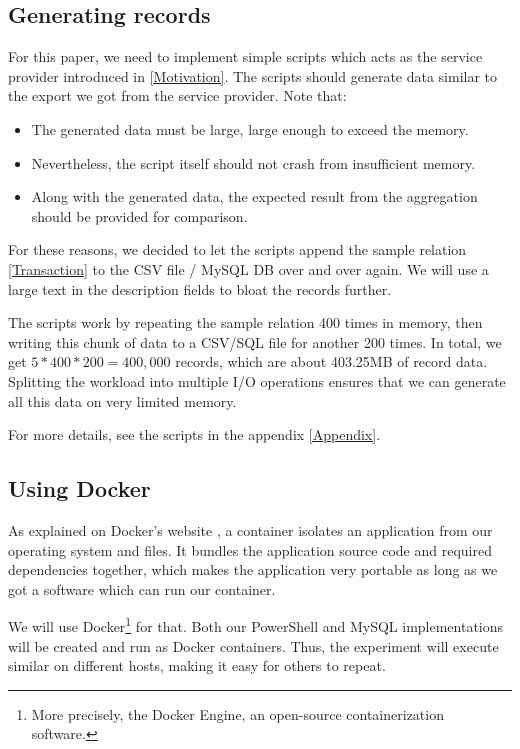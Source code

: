 \subsection{Generating records} \label{Generating records}

For this paper, we need to implement simple scripts which acts as the
service provider introduced in \ref{Motivation}. The scripts
should generate data similar to the export we got from
the service provider. Note that:
\begin{itemize}
    \item The generated data must be large, large enough to exceed
        the memory.
    \item Nevertheless, the script itself should not crash from
        insufficient memory.
    \item Along with the generated data, the expected result from the
        aggregation should be provided for comparison.
\end{itemize}
For these reasons, we decided to let the scripts append the
sample relation \ref{Transaction} to the \gls{CSV} file / \gls{MySQL} \gls{DB}
over and over again. We will use a large text in the description
fields to bloat the records further.

The scripts work by repeating the sample relation 400 times in memory,
then writing this chunk of data to a \gls{CSV}/\gls{SQL} file for another 200 times.
In total, we get $5*400*200=400,000$ records, which are about 403.25MB
of record data. Splitting the workload into multiple \gls{I/O} operations
ensures that we can generate all this data on very limited memory.

For more details, see the scripts in the appendix \ref{Appendix}.

\subsection{Using Docker}

As explained on \gls{Docker}'s website \cite{docContainer}, a container isolates
an application from our operating system and files.
It bundles the application source code and
required dependencies together, which makes the application
very portable as long as we got a software which can run our container.

We will use \gls{Docker}\footnote{More precisely, the Docker Engine, an open-source containerization software.}
for that. Both our \gls{PowerShell} and MySQL implementations
will be created and run as \gls{Docker} containers. Thus,
the experiment will execute similar on different hosts, making
it easy for others to repeat.

